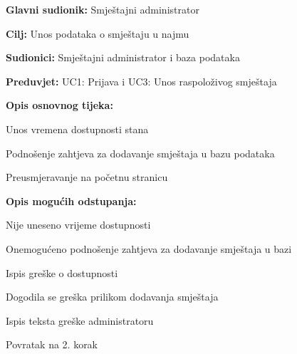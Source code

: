 					\noindent {}
					\begin{packed_item}
						
						\item \textbf{Glavni sudionik: }Smještajni administrator
						\item  \textbf{Cilj:} Unos podataka o smještaju u najmu
						\item  \textbf{Sudionici:} Smještajni administrator i baza podataka
						\item  \textbf{Preduvjet:} UC1: Prijava i UC3: Unos raspoloživog smještaja
						\item  \textbf{Opis osnovnog tijeka:}
						
						\item[] \begin{packed_enum}
							
							\item Unos vremena dostupnosti stana
							\item Podnošenje zahtjeva za dodavanje smještaja u bazu podataka
							\item Preusmjeravanje na početnu stranicu
							
						\end{packed_enum}
						
						\item  \textbf{Opis mogućih odstupanja:}
						
						\item[] \begin{packed_item}
							
							\item[1.a] Nije uneseno vrijeme dostupnosti
							\item[] \begin{packed_enum}
								
								\item Onemogućeno podnošenje zahtjeva za dodavanje smještaja u bazi
								\item Ispis greške o dostupnosti
								
							\end{packed_enum}
							
							\item[2.a] Dogodila se greška prilikom dodavanja smještaja
							\item[] \begin{packed_enum}
								
								\item Ispis teksta greške administratoru
								\item Povratak na 2. korak
								
							\end{packed_enum}
							
						\end{packed_item}
					\end{packed_item}
					
